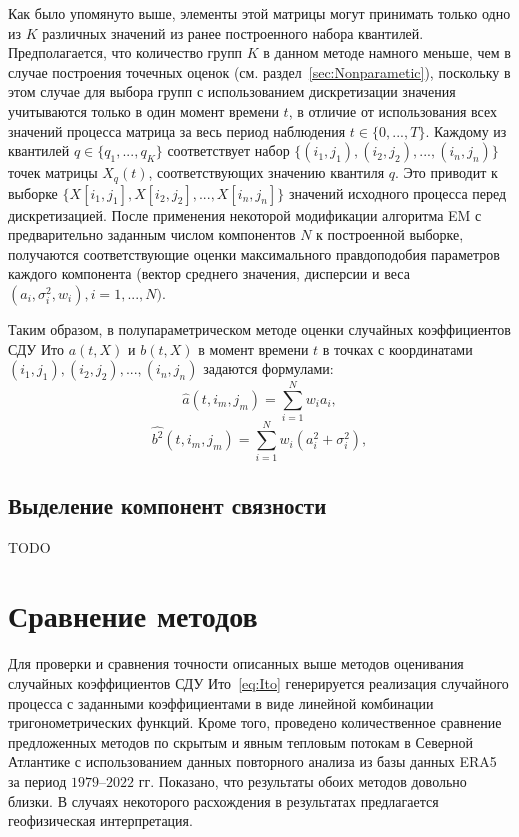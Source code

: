 Как было упомянуто выше, элементы этой матрицы могут принимать только одно из $K$ различных значений из ранее построенного набора квантилей. Предполагается, что количество групп $K$ в данном методе намного меньше, чем в случае построения точечных оценок (см. раздел~\ref{sec:Nonparametic}), поскольку в этом случае для выбора групп с использованием дискретизации значения учитываются только в один момент времени $t$, в отличие от использования всех значений процесса матрица за весь период наблюдения $t \in \{0,...,T\}$. Каждому из квантилей $q \in \{q_1,..., q_K\}$ соответствует набор $\{(i_1, j_1), (i_2, j_2),..., (i_n, j_n)\}$ точек матрицы $X_q(t)$, соответствующих значению квантиля $q$. Это приводит к выборке $\{X[i_1,j_1 ], X[i_2,j_2 ],...,X[i_n,j_n]\}$ значений исходного процесса перед дискретизацией. После применения некоторой модификации алгоритма EM с предварительно заданным числом компонентов $N$ к построенной выборке, получаются соответствующие оценки максимального правдоподобия параметров каждого компонента (вектор среднего значения, дисперсии и веса $(a_i,\sigma_i^2, w_i), i=1,...,N)$.


Таким образом, в полупараметрическом методе оценки случайных коэффициентов СДУ Ито $a(t, X)$ и $b(t,X)$ в момент времени $t$ в точках с координатами $(i_1, j_1), (i_2,j_2),..., (i_n, j_n)$ задаются формулами:
$$
\hat{a}(t, i_m, j_m) = \sum\limits_{i=1}^N w_i a_i,
$$
$$
\hat{b^2}(t, i_m, j_m) = \sum\limits_{i=1}^N w_i (a_i^2 + \sigma_i^2),
$$
\subsection{Выделение компонент связности}
\label{sec:Components}
TODO \cite{2020_statistical_estimation_Langevin} \cite{gorshenin2020efficiency}



\section{Сравнение методов}
\label{sec:Compare}
Для проверки и сравнения точности описанных выше методов оценивания случайных коэффициентов СДУ Ито~\eqref{eq:Ito} генерируется реализация случайного процесса с заданными коэффициентами в виде линейной комбинации тригонометрических функций. Кроме того, проведено количественное сравнение предложенных методов по скрытым и явным тепловым потокам в Северной Атлантике с использованием данных повторного анализа из базы данных ERA5 за период $1979$--$2022$ гг. Показано, что результаты обоих методов довольно близки. В случаях некоторого расхождения в результатах предлагается геофизическая интерпретация.

